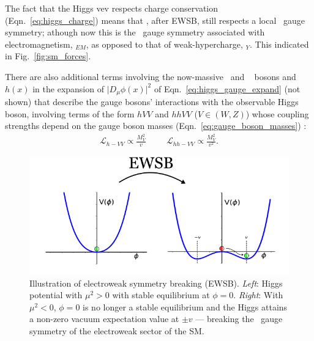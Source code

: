 The fact that the Higgs vev respects charge conservation (Eqn.~\ref{eq:higgs_charge}) means
that \SML, after EWSB, still respects a local \Uone~gauge symmetry; athough now
this is the \Uone~gauge symmetry associated with electromagnetism, \Uone$_{EM}$,
as opposed to that of weak-hypercharge, \Uone$_Y$. This indicated in Fig.~\ref{fig:sm_forces}.

There are also additional terms involving the now-massive \fieldWpm~and \fieldZ~ bosons and $h(x)$ in the expansion of $\lvert D_{\mu}\phi(x)\rvert^2$ of
Eqn.~\ref{eq:higgs_gauge_expand} (not shown) that describe the gauge bosons' interactions with the observable Higgs boson,
involving terms of the form $hVV$ and $hhVV$ ($V\in(W,Z)$) whose coupling strengths depend
on the gauge boson masses (Eqn.~\ref{eq:gauge_boson_masses}) {\color{red}{feynman diagrams?}}:
\begin{align}
	\mathcal{L}_{h-VV} \propto \frac{M_V^2}{v} \hspace{1cm} \mathcal{L}_{hh-VV} \propto \frac{M_V^2}{v^2}.
	\label{eq:higgs_gauge_couplings}
\end{align}
\begin{figure}[!htb]
	\begin{center}
		\includegraphics[width=\textwidth]{figures/chapter1/higgs_potential_trans}
		\caption{Illustration of electroweak symmetry breaking (EWSB).
			\textit{Left}: Higgs potential with $\mu^2>0$ with stable equilibrium at $\phi=0$.
			\textit{Right}: With $\mu^2<0$, $\phi=0$ is no longer
			a stable equilibrium and the Higgs attains a non-zero vacuum
			expectation value at $\pm v$ --- breaking the \SUewk~gauge symmetry of the electroweak
			sector of the SM.
		}
	\label{fig:higgs_ewsb}
	\end{center}
\end{figure}

